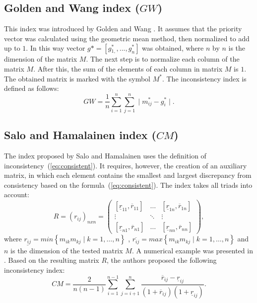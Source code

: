 \subsection{Golden and Wang index ($\textit{GW}$)}

This index was introduced by Golden and Wang \cite{Golden1989}. It assumes that the priority vector was calculated using the geometric mean method, then normalized to add up to $1$. In this way vector $g*=[g{}_{1,}^{*},...,g_{n}^{*}]$ was obtained, where $n$ by $n$ is the dimension of the matrix $M$. The next step is to normalize each column of the matrix $M$. After this, the sum of the elements of each column in matrix $M$ is $1$. The obtained matrix is marked with the symbol $M^{*}$. The inconsistency index is defined as follows:
	\begin{equation} 
		\textit{GW}=\frac{1}{n}\sum_{i=1}^{n}\sum_{j=1}^{n}\mid m_{ij}^{*}-g_{i}^{*}\mid.
	 \end{equation}
 

\subsection{Salo and Hamalainen index ($\textit{CM}$)}

The index proposed by Salo and Hamalainen \cite{SALO1995} uses the definition of inconsistency~(\ref{eq:consistent}). It requires, however, the creation of an auxiliary matrix, in which each element contains the smallest and largest discrepancy from consistency based on the formula~(\ref{eq:consistent}). The index takes all triads into account:
	\begin{equation} 
		R=(r_{ij})_{nxn}=\left(\begin{array}{ccc}
			[\underline{r}_{11},\overline{r}_{11}] & \ldots & [\underline{r}_{1n},\overline{r}_{1n}]\\
			\vdots & \ddots & \vdots\\{}
			[\underline{r}_{n1},\overline{r}_{n1}] & \ldots & [\underline{r}_{nn},\overline{r}_{nn}]
		\end{array}\right),
	\end{equation}
 where $\underline{r_{ij}}=min\left\{ m_{ik}m_{kj}\mid k=1,\ldots,n\right\}$ , $\overline{r_{ij}}=max\left\{ m_{ik}m_{kj}\mid k=1,\ldots,n\right\}$ and $n$ is the dimension of the tested matrix $M$. A numerical example was presented in \cite{Brunelli2015}. Based on the resulting matrix $R$, the authors proposed the following inconsistency index:
 	\begin{equation} 
		\textit{CM}=\frac{2}{n(n-1)}\sum_{i=1}^{n-1}\sum_{j=i+1}^{n}\frac{\overline{r}_{ij}-\underline{r}_{ij}}{\left(1+\overline{r}_{ij}\right)\left(1+\underline{r}_{ij}\right)}.
	 \end{equation}
 

